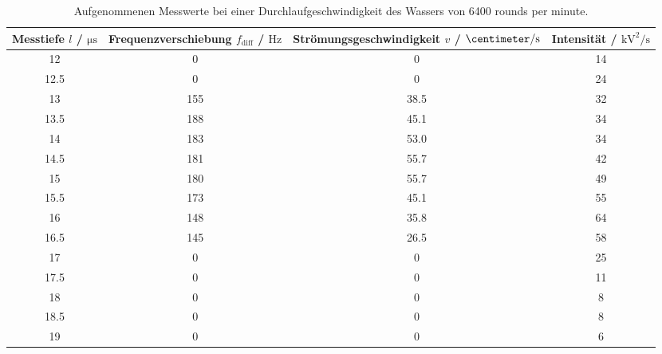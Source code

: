 \begin{table}
  \centering
  \begin{tabular}{c c c c}
    \toprule
    Messtiefe $l$ / $\si{\micro\second}$ & Frequenzverschiebung $f_{\mathrm{diff}}$ / $\si{\hertz}$ & Strömungsgeschwindigkeit $v$ / $\si{\centimeter\per\second}$ & Intensität / $\si{\kilo\volt\squared\per\second}$ \\
    \midrule
    12          &    0      &     0          &     14\\
    12.5        &    0      &     0          &     24\\
    13          &    155    &     38.5       &     32\\
    13.5        &    188    &     45.1       &     34\\
    14          &    183    &     53.0       &     34\\
    14.5        &    181    &     55.7       &     42\\
    15          &    180    &     55.7       &     49\\
    15.5        &    173    &     45.1       &     55\\
    16          &    148    &     35.8       &     64\\
    16.5        &    145    &     26.5       &     58\\          
    17          &    0      &     0          &     25\\
    17.5        &    0     &      0          &     11\\
    18          &    0     &      0          &     8\\
    18.5        &    0     &      0          &     8\\
    19          &    0     &      0          &     6\\
    \bottomrule
  \end{tabular}
  \caption{Aufgenommenen Messwerte bei einer Durchlaufgeschwindigkeit des Wassers von 6400 rounds per minute.}
  \label{tab:Teil2_70}
\end{table}
